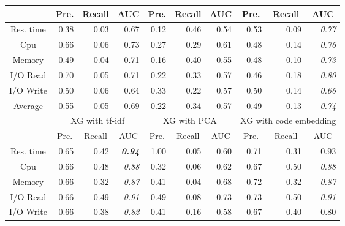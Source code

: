 \begin{table*}
\begin{tabular}{|c|r|r|r|r|r|r|r|r|r|}
                  & \multicolumn{1}{c|}{Pre.} & \multicolumn{1}{c|}{Recall} & \multicolumn{1}{c|}{AUC} & \multicolumn{1}{c|}{Pre.} & \multicolumn{1}{c|}{Recall} & \multicolumn{1}{c|}{AUC} & \multicolumn{1}{c|}{Pre.} & \multicolumn{1}{c|}{Recall} & \multicolumn{1}{c|}{AUC} \\ \hline
Res. time         & 0.38  & 0.03    & 0.67 & 0.12  & 0.46    & 0.54 & 0.53  & 0.09    & \textit{0.77}            \\ \hline
Cpu               & 0.66  & 0.06    & 0.73 & 0.27  & 0.29    & 0.61 & 0.48  & 0.14    & \textit{0.76}            \\ \hline
Memory            & 0.49  & 0.04    & 0.71 & 0.16  & 0.40    & 0.55 & 0.48  & 0.10    & \textit{0.73}            \\ \hline
I/O Read          & 0.70  & 0.05    & 0.71 & 0.22  & 0.33    & 0.57 & 0.46  & 0.18    & \textit{0.80}            \\ \hline
I/O Write         & 0.50  & 0.06    & 0.64 & 0.33  & 0.22    & 0.57 & 0.50  & 0.14    & \textit{0.66}            \\ \hline
Average           & 0.55  & 0.05    & 0.69 & 0.22  & 0.34    & 0.57 & 0.49  & 0.13    & \textit{0.74}            \\ \hline
\multirow{2}{*}{} & \multicolumn{3}{c|}{XG with tf-idf}        & \multicolumn{3}{c|}{XG with PCA}           & \multicolumn{3}{c|}{XG with code embedding}\\ \cline{2-10} 
                  & \multicolumn{1}{c|}{Pre.} & \multicolumn{1}{c|}{Recall} & \multicolumn{1}{c|}{AUC} & \multicolumn{1}{c|}{Pre.} & \multicolumn{1}{c|}{Recall} & \multicolumn{1}{c|}{AUC} & \multicolumn{1}{c|}{Pre.} & \multicolumn{1}{c|}{Recall} & \multicolumn{1}{c|}{AUC} \\ \hline
Res. time         & 0.65  & 0.42    & \textit{\textbf{0.94}}   & 1.00  & 0.05    & 0.60 & 0.71  & 0.31    & 0.93 \\ \hline
Cpu               & 0.66  & 0.48    & \textit{0.88}            & 0.32  & 0.06    & 0.62 & 0.67  & 0.50    & \textit{0.88}            \\ \hline
Memory            & 0.66  & 0.32    & \textit{0.87}            & 0.41  & 0.04    & 0.68 & 0.72  & 0.32    & \textit{0.87}            \\ \hline
I/O Read          & 0.66  & 0.49    & \textit{0.91}            & 0.49  & 0.08    & 0.73 & 0.73  & 0.50    & \textit{0.91}            \\ \hline
I/O Write         & 0.66  & 0.38    & \textit{0.82}            & 0.41  & 0.16    & 0.58 & 0.67  & 0.40    & 0.80 \\ \hline

\end{tabular}
\end{table*}
